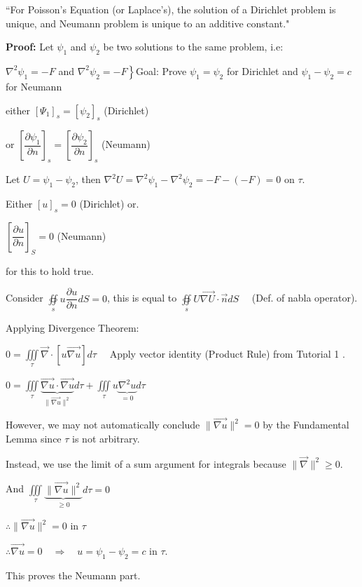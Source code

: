 \documentclass{report}
\begin{document}
``For Poisson's Equation (or Laplace's), the solution of a Dirichlet problem is unique, and Neumann problem is unique to an additive constant."


\textbf{Proof:} Let $\psi_{1}$ and $\psi_{2}$ be two solutions to the same problem, i.e:

$\nabla^{2} \psi_{1}=-F$ and $\left.\nabla^{2} \psi_{2}=-F\right\}$\qquad Goal: Prove $\psi_{1}=\psi_{2}$ for Dirichlet and $\psi_{1}-\psi_{2}=c$ for Neumann

either $\left[\Psi_{1}\right]_{s}=\left[\psi_{2}\right]_{s}$ (Dirichlet) 

or $\left[\dfrac{\partial \psi_{1}}{\partial n}\right]_{s}=\left[\dfrac{\partial \psi_{2}}{\partial n}\right]_{s}$ (Neumann)

Let $U=\psi_{1}-\psi_{2}$, then $\nabla^{2} U=\nabla^{2} \psi_{1}-\nabla^{2} \psi_{2}=-F-(-F)=0$ on $\tau.$

Either $[u]_{s}=0$ (Dirichlet) 
or. 

$\left[\dfrac{\partial u}{\partial n}\right]_{S}=0$ (Neumann)

for this to hold true.

Consider $\oiint\limits_{s} u \dfrac{\partial u}{\partial n} d S=0$, this is equal to $\oiint\limits_{s} U \overrightarrow{\nabla U} \cdot \vec{n} d S \quad$ (Def. of nabla operator).

Applying Divergence Theorem:

$0=\iiint\limits_{\tau} \vec{\nabla} \cdot[u \overrightarrow{\nabla u}] d \tau \quad$ Apply vector identity (Product Rule) from Tutorial 1 .


$0=\iiint\limits_{\tau} \underbrace{\overrightarrow{\nabla u} \cdot \overrightarrow{\nabla u}}_{\|\overrightarrow{\nabla u}\|^{2}} d \tau+\iiint\limits_{\tau} u \underbrace{\nabla^{2} u}_{=0} d \tau
$

However, we may not automatically conclude $\|\overrightarrow{\nabla u}\|^{2}=0$ by the Fundamental Lemma since $\tau$ is not arbitrary.

Instead, we use the limit of a sum argument for integrals because $\|\vec{\nabla}\|^{2} \geqslant 0$.

And $\iiint\limits_{\tau} \underbrace{\|\vec{\nabla u}\|^{2}}_{\geq 0} d \tau=0 \quad$ 

$\therefore\|\overrightarrow{\nabla u}\|^2=0$ in $\tau$

$\therefore\overrightarrow{\nabla u}=0\quad\Rightarrow\quad u=\psi_1-\psi_2=c$ in $\tau$.

This proves the Neumann part.
\end{document}
